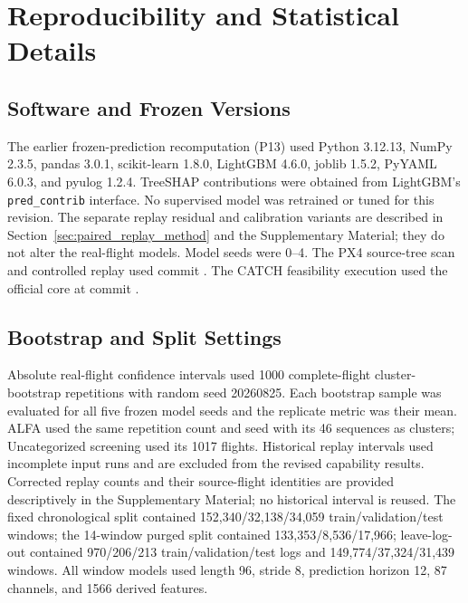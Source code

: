 \section{Reproducibility and Statistical Details}
\label{app:reproducibility}

\subsection{Software and Frozen Versions}

The earlier frozen-prediction recomputation (P13) used Python 3.12.13, NumPy 2.3.5, pandas 3.0.1, scikit-learn 1.8.0, LightGBM 4.6.0, joblib 1.5.2, PyYAML 6.0.3, and pyulog 1.2.4. TreeSHAP contributions were obtained from LightGBM's \texttt{pred\_contrib} interface. No supervised model was retrained or tuned for this revision. The separate replay residual and calibration variants are described in Section~\ref{sec:paired_replay_method} and the Supplementary Material; they do not alter the real-flight models. Model seeds were 0--4. The PX4 source-tree scan and controlled replay used commit \texttt{}. The CATCH feasibility execution used the official core at commit \texttt{}.

\subsection{Bootstrap and Split Settings}

Absolute real-flight confidence intervals used 1000 complete-flight cluster-bootstrap repetitions with random seed 20260825. Each bootstrap sample was evaluated for all five frozen model seeds and the replicate metric was their mean. ALFA used the same repetition count and seed with its 46 sequences as clusters; Uncategorized screening used its 1017 flights. Historical replay intervals used incomplete input runs and are excluded from the revised capability results. Corrected replay counts and their source-flight identities are provided descriptively in the Supplementary Material; no historical interval is reused. The fixed chronological split contained 152,340/32,138/34,059 train/validation/test windows; the 14-window purged split contained 133,353/8,536/17,966; leave-log-out contained 970/206/213 train/validation/test logs and 149,774/37,324/31,439 windows. All window models used length 96, stride 8, prediction horizon 12, 87 channels, and 1566 derived features.

